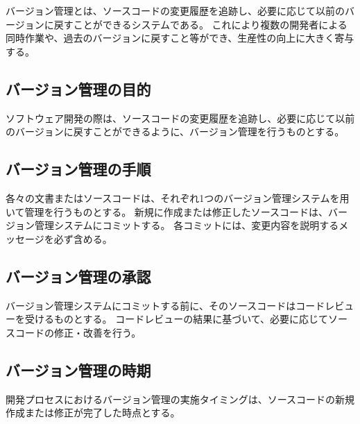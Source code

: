 \clearpage
バージョン管理とは、ソースコードの変更履歴を追跡し、必要に応じて以前のバージョンに戻すことができるシステムである。
これにより複数の開発者による同時作業や、過去のバージョンに戻すこと等ができ、生産性の向上に大きく寄与する。

\subsection{バージョン管理の目的}
ソフトウェア開発の際は、ソースコードの変更履歴を追跡し、必要に応じて以前のバージョンに戻すことができるように、バージョン管理を行うものとする。

\subsection{バージョン管理の手順}
各々の文書またはソースコードは、それぞれ1つのバージョン管理システムを用いて管理を行うものとする。
新規に作成または修正したソースコードは、バージョン管理システムにコミットする。
各コミットには、変更内容を説明するメッセージを必ず含める。

\subsection{バージョン管理の承認}
バージョン管理システムにコミットする前に、そのソースコードはコードレビューを受けるものとする。
コードレビューの結果に基づいて、必要に応じてソースコードの修正・改善を行う。

\subsection{バージョン管理の時期}
開発プロセスにおけるバージョン管理の実施タイミングは、ソースコードの新規作成または修正が完了した時点とする。


